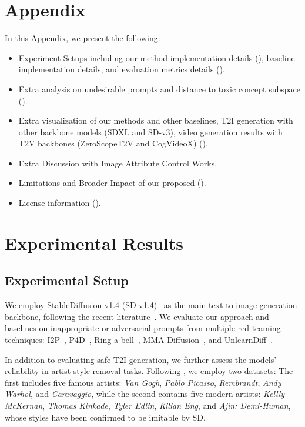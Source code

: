 \newpage

\appendix

\section*{Appendix} 

In this Appendix, we present the following:
\begin{itemize}[leftmargin=15pt]
\item Experiment Setups including our method implementation details (), baseline implementation details, and evaluation metrics details (). 
\item Extra analysis on undesirable prompts and distance to toxic concept subspace ().
\item Extra visualization of our methods and other baselines, T2I generation with other backbone models (SDXL and SD-v3), video generation results with T2V backbones (ZeroScopeT2V and CogVideoX) ().
\item Extra Discussion with Image Attribute Control Works.
\item Limitations and Broader Impact of our proposed \ours{} ().
\item License information ().

\end{itemize}




\section{Experimental Results}
\subsection{Experimental Setup}\label{app:exp_setup}
We employ StableDiffusion-v1.4 (SD-v1.4)~\citep{rombach2022high} as the main text-to-image generation backbone, following the recent literature~\citep{gandikota2023erasing,gandikota2024unified,gong2024reliable}.
We evaluate our approach and baselines on inappropriate or adversarial prompts from multiple red-teaming techniques:  I2P~\citep{schramowski2023safe}, P4D~\citep{chin2024prompting4debugging}, Ring-a-bell~\citep{tsai2024ring}, MMA-Diffusion~\citep{yang2024mma}, and UnlearnDiff~\citep{zhang2023generate}. 

In addition to evaluating safe T2I generation, we further assess the models' reliability in artist-style removal tasks. Following \cite{gandikota2023erasing}, we employ two datasets: The first includes five famous artists: \textit{Van Gogh}, \textit{Pablo Picasso}, \textit{Rembrandt}, \textit{Andy Warhol}, and \textit{Caravaggio}, while the second contains five modern artists: \textit{Kellly McKernan}, \textit{Thomas Kinkade}, \textit{Tyler Edlin}, \textit{Kilian Eng}, and \textit{Ajin: Demi-Human}, whose styles have been confirmed to be imitable by SD.


